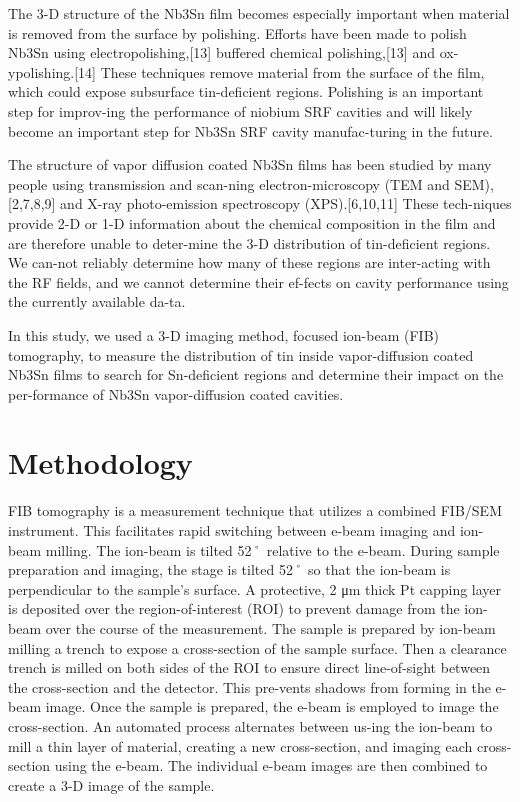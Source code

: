 The 3-D structure of the Nb3Sn film becomes especially important when material is removed from the surface by polishing. Efforts have been made to polish Nb3Sn using electropolishing,[13] buffered chemical polishing,[13] and ox-ypolishing.[14] These techniques remove material from the surface of the film, which could expose subsurface tin-deficient regions. Polishing is an important step for improv-ing the performance of niobium SRF cavities and will likely become an important step for Nb3Sn SRF cavity manufac-turing in the future. 

The structure of vapor diffusion coated Nb3Sn films has been studied by many people using transmission and scan-ning electron-microscopy (TEM and SEM),[2,7,8,9] and X-ray photo-emission spectroscopy (XPS).[6,10,11] These tech-niques provide 2-D or 1-D information about the chemical composition in the film and are therefore unable to deter-mine the 3-D distribution of tin-deficient regions. We can-not reliably determine how many of these regions are inter-acting with the RF fields, and we cannot determine their ef-fects on cavity performance using the currently available da-ta. 

In this study, we used a 3-D imaging method, focused ion-beam (FIB) tomography, to measure the distribution of tin inside vapor-diffusion coated Nb3Sn films to search for Sn-deficient regions and determine their impact on the per-formance of Nb3Sn vapor-diffusion coated cavities.

\section{Methodology}

FIB tomography is a measurement technique that utilizes a combined FIB/SEM instrument. This facilitates rapid switching between e-beam imaging and ion-beam milling. The ion-beam is tilted 52˚ relative to the e-beam. During sample preparation and imaging, the stage is tilted 52˚ so that the ion-beam is perpendicular to the sample’s surface. A protective, 2 μm thick Pt capping layer is deposited over the region-of-interest (ROI) to prevent damage from the ion-beam over the course of the measurement. The sample is prepared by ion-beam milling a trench to expose a cross-section of the sample surface. Then a clearance trench is milled on both sides of the ROI to ensure direct line-of-sight between the cross-section and the detector. This pre-vents shadows from forming in the e-beam image. Once the sample is prepared, the e-beam is employed to image the cross-section. An automated process alternates between us-ing the ion-beam to mill a thin layer of material, creating a new cross-section, and imaging each cross-section using the e-beam. The individual e-beam images are then combined to create a 3-D image of the sample.
 
